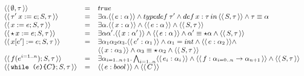 \documentclass[a4paper,8pt]{article}
\newcommand{\constr}[1]{\ensuremath{\langle\langle\,#1\,\rangle\rangle}}
\begin{document}
     \begin{figure}[h]
       \[
          \small{
           \begin{array}{lcl}
               \constr{\emptyset, \tau} & = & true \\
               \constr{\tau'\:x := e; S, \tau} & = & \exists \alpha. \constr{e : \alpha} \land
                                              typedef\:\tau' \land
                                              def\,x:\tau\,in\,\constr{S
                                                     , \tau}
             \land \tau \equiv \alpha\\
               \constr{x := e ; S, \tau} & = & \exists \alpha. \constr{x : \alpha}\land\constr{e : \alpha} \land
                                                      \constr{S , \tau}\\ 
               \constr{\star\,x := e ; S, \tau} & = & \exists \alpha \alpha'. \constr{x : \alpha'}\land\constr{e : \alpha} \land
                                                      \alpha' \equiv
                                                \star
                                                      \alpha\land\constr{S
                                                      , \tau}\\ 
               \constr{x[e'] := e ; S , \tau} & = &
                                             \exists\alpha_1\alpha_2\alpha_3.\constr{e'
                                             : \alpha_1}\land \alpha_1
                                             = int \land \constr{e :
                                             \alpha_2} \land \\ 
                       & & \constr{x : \alpha_3} \land
                           \alpha_3 \equiv \star\,\alpha_2 \land
                           \constr{S , \tau}\\
               \constr{f(e^{i=1..n}) ; S , \tau} & = & \exists
                                            \alpha_{i=1..n +1}.\bigwedge_{i
                                            = 1..n}\constr{e_i :
                                            \alpha_i} \land \constr{f
                                            : \alpha_{i = 0.. n} \to
                                            \alpha_{n + 1}} \land
                                                \constr{S , \tau}\\
               \constr{\texttt{while (} e
             \texttt{)\{}C\texttt{\}} ; S , \tau} &= & \constr{e : bool}
                                                     \land
                                                     \constr{C
}
\end{array}}\]
\end{figure}
\end{document}

